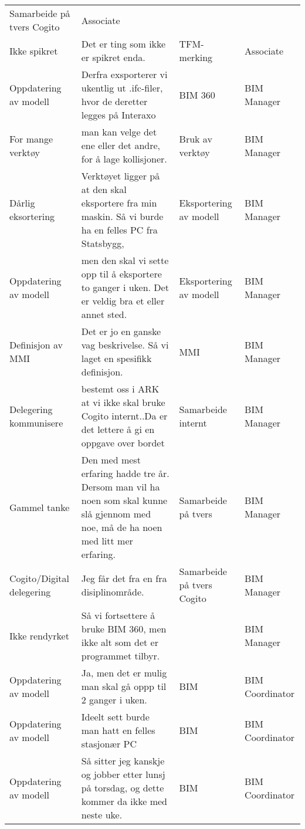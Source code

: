 \begin{landscape}
\begin{longtable}{p{0.25\textheight}p{0.5\textheight}p{0.25\textheight}p{0.25\textheight}}
      Samarbeide på tvers Cogito &
      Associate \\
    Ikke spikret &
      Det er ting som ikke er spikret enda. &
      TFM-merking &
      Associate \\
    Oppdatering av modell &
      Derfra exsporterer vi ukentlig ut .ifc-filer, hvor de deretter legges på Interaxo &
      BIM 360 &
      BIM Manager \\
    For mange verktøy &
      man kan velge det ene eller det andre, for å lage kollisjoner. &
      Bruk av verktøy &
      BIM Manager \\
    Dårlig eksortering &
      Verktøyet ligger på at den skal eksportere fra min maskin. Så vi burde ha en felles PC fra Statsbygg, &
      Eksportering av modell &
      BIM Manager \\
    Oppdatering av modell &
      men den skal vi sette opp til å eksportere to ganger i uken. Det er veldig bra et eller annet sted. &
      Eksportering av modell &
      BIM Manager \\
    Definisjon av MMI &
      Det er jo en ganske vag beskrivelse. Så vi laget en spesifikk definisjon. &
      MMI &
      BIM Manager \\
    Delegering kommunisere &
      bestemt oss i ARK at vi ikke skal bruke Cogito internt..Da er det lettere å gi en oppgave over bordet &
      Samarbeide internt &
      BIM Manager \\
    Gammel tanke &
      Den med mest erfaring hadde tre år. Dersom man vil ha noen som skal kunne slå gjennom med noe, må de ha noen med litt mer erfaring. &
      Samarbeide på tvers &
      BIM Manager \\
    Cogito/Digital delegering &
      Jeg får det fra en fra disiplinområde. &
      Samarbeide på tvers Cogito &
      BIM Manager \\
    Ikke rendyrket &
      Så vi fortsettere å bruke BIM 360, men ikke alt som det er programmet tilbyr. &
       &
      BIM Manager \\
    Oppdatering av modell &
      Ja, men det er mulig man skal gå oppp til 2 ganger i uken. &
      BIM &
      BIM Coordinator \\
    Oppdatering av modell &
      Ideelt sett burde man hatt en felles stasjonær PC &
      BIM &
      BIM Coordinator \\
    Oppdatering av modell &
      Så sitter jeg kanskje og jobber etter lunsj på torsdag, og dette kommer da ikke med neste uke. &
      BIM &
      BIM Coordinator \\

\end{longtable}
\end{landscape}
